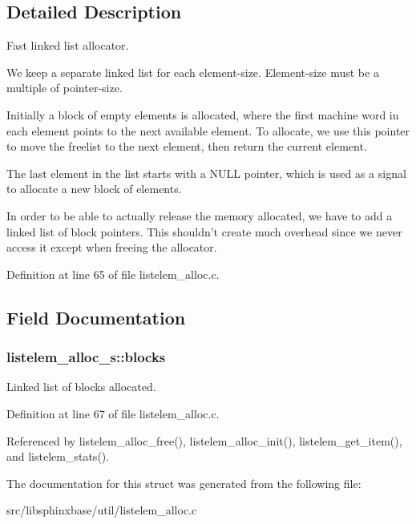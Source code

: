 \subsection{\-Detailed \-Description}
\-Fast linked list allocator. 

\-We keep a separate linked list for each element-\/size. \-Element-\/size must be a multiple of pointer-\/size.

\-Initially a block of empty elements is allocated, where the first machine word in each element points to the next available element. \-To allocate, we use this pointer to move the freelist to the next element, then return the current element.

\-The last element in the list starts with a \-N\-U\-L\-L pointer, which is used as a signal to allocate a new block of elements.

\-In order to be able to actually release the memory allocated, we have to add a linked list of block pointers. \-This shouldn't create much overhead since we never access it except when freeing the allocator. 

\-Definition at line 65 of file listelem\-\_\-alloc.\-c.



\subsection{\-Field \-Documentation}
\subsubsection[{blocks}]{ {\bf listelem\-\_\-alloc\-\_\-s\-::blocks}}\label{structlistelem__alloc__s_a1216578b1d5416dc0a03c802cfa1def9}


\-Linked list of blocks allocated. 



\-Definition at line 67 of file listelem\-\_\-alloc.\-c.



\-Referenced by listelem\-\_\-alloc\-\_\-free(), listelem\-\_\-alloc\-\_\-init(), listelem\-\_\-get\-\_\-item(), and listelem\-\_\-stats().



\-The documentation for this struct was generated from the following file\-:\begin{DoxyCompactItemize}
\item 
src/libsphinxbase/util/listelem\-\_\-alloc.\-c\end{DoxyCompactItemize}

